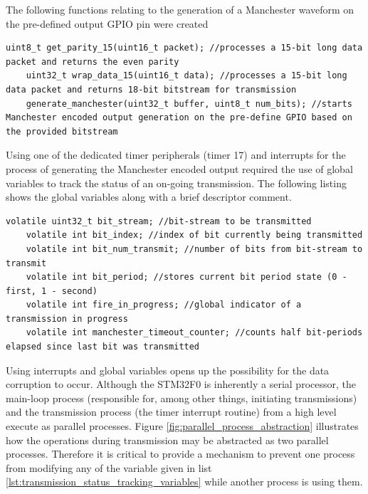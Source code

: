 The following functions relating to the generation of a Manchester waveform on the pre-defined output GPIO pin were created

\begin{lstlisting}[style=cstyle, caption=Transmission Related Functions\label{transmission_related_functions}]
	uint8_t get_parity_15(uint16_t packet); //processes a 15-bit long data packet and returns the even parity
	uint32_t wrap_data_15(uint16_t data); //processes a 15-bit long data packet and returns 18-bit bitstream for transmission
	generate_manchester(uint32_t buffer, uint8_t num_bits); //starts Manchester encoded output generation on the pre-define GPIO based on the provided bitstream
\end{lstlisting}

Using one of the dedicated timer peripherals (timer 17) and interrupts for the process of generating the Manchester encoded output required the use of global variables to track the status of an on-going transmission. The following listing shows the global variables along with a brief descriptor comment.

\begin{lstlisting}[style=cstyle, caption=Transmission Status Tracking Variables\label{lst:transmission_status_tracking_variables}]
	volatile uint32_t bit_stream; //bit-stream to be transmitted
	volatile int bit_index; //index of bit currently being transmitted
	volatile int bit_num_transmit; //number of bits from bit-stream to transmit
	volatile int bit_period; //stores current bit period state (0 - first, 1 - second)
	volatile int fire_in_progress; //global indicator of a transmission in progress
	volatile int manchester_timeout_counter; //counts half bit-periods elapsed since last bit was transmitted
\end{lstlisting}

Using interrupts and global variables opens up the possibility for the data corruption to occur. Although the STM32F0 is inherently a serial processor, the main-loop process (responsible for, among other things, initiating transmissions) and the transmission process (the timer interrupt routine) from a high level execute as parallel processes. Figure \ref{fig:parallel_process_abstraction} illustrates how the operations during transmission may be abstracted as two parallel processes. Therefore it is critical to provide a mechanism to prevent one process from modifying any of the variable given in list \ref{lst:transmission_status_tracking_variables} while another process is using them.

